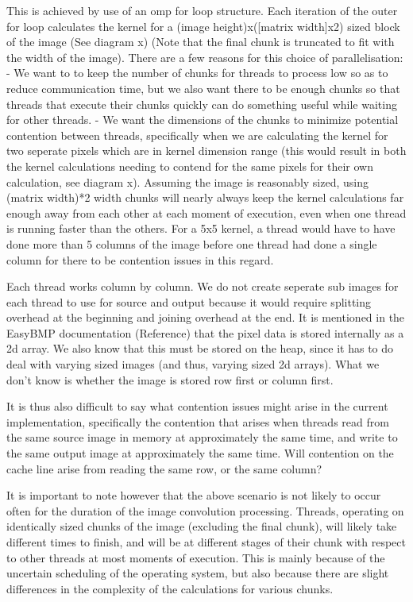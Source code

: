 \documentclass[paper=a4, fontsize=11pt]{scrartcl} %
\numberwithin{equation}{section} %
\numberwithin{figure}{section} %
\numberwithin{table}{section} %
\begin{document}
This is achieved by use of an omp for loop structure. Each iteration of the outer for loop calculates the kernel for a (image height)x([matrix width]x2) sized block of the image (See diagram x) (Note that the final chunk is truncated to fit with the width of the image).  There are a few reasons for this choice of parallelisation:
- We want to to keep the number of chunks for threads to process low so as to reduce communication time, but we also want there to be enough chunks so that threads that execute their chunks quickly can do something useful while waiting for other threads.
- We want the dimensions of the chunks to minimize potential contention between threads, specifically when we are calculating the kernel for two seperate pixels which are in kernel dimension range (this would result in both the kernel calculations needing to contend for the same pixels for their own calculation, see diagram x). Assuming the image is reasonably sized, using (matrix width)*2 width chunks will nearly always keep the kernel calculations far enough away from each other at each moment of execution, even when one thread is running faster than the others. For a 5x5 kernel, a thread would have to have done more than 5 columns of the image before one thread had done a single column for there to be contention issues in this regard.

Each thread works column by column. We do not create seperate sub images for each thread to use for source and output because it would require splitting overhead at the beginning and joining overhead at the end. It is mentioned in the EasyBMP documentation (Reference) that the pixel data is stored internally as a 2d array. We also know that this must be stored on the heap, since it has to do deal with varying sized images (and thus, varying sized 2d arrays). What we don't know is whether the image is stored row first or column first. 

It is thus also difficult to say what contention issues might arise in the current implementation, specifically the contention that arises when threads read from the same source image in memory at approximately the same time, and write to the same output image at approximately the same time. Will contention on the cache line arise from reading the same row, or the same column?

It is important to note however that the above scenario is not likely to occur often for the duration of the image convolution processing. Threads, operating on identically sized chunks of the image (excluding the final chunk), will likely take different times to finish, and will be at different stages of their chunk with respect to other threads at most moments of execution. This is mainly because of the uncertain scheduling of the operating system, but also because there are slight differences in the complexity of the calculations for various chunks.
\end{document}
